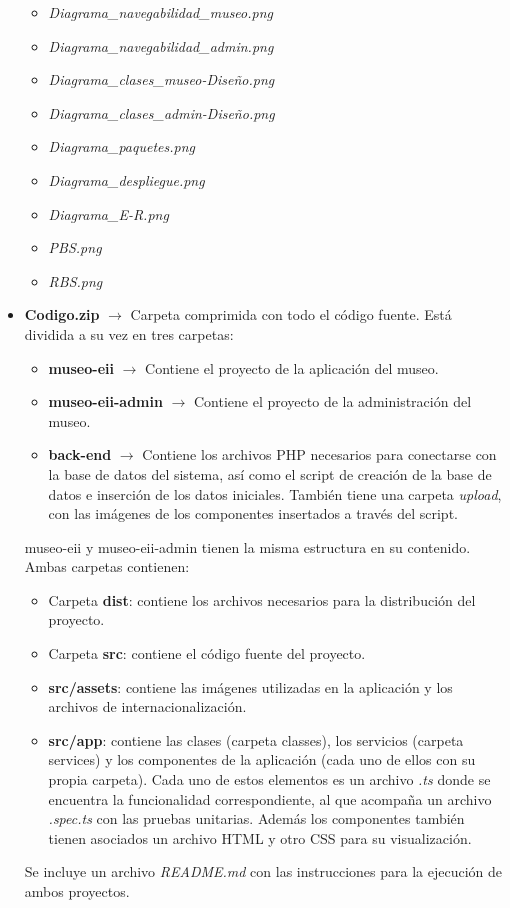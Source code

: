 \begin{itemize}
\begin{itemize}
		\item \textit{Diagrama\_navegabilidad\_museo.png}
		\item \textit{Diagrama\_navegabilidad\_admin.png}
		\item \textit{Diagrama\_clases\_museo-Diseño.png}
		\item \textit{Diagrama\_clases\_admin-Diseño.png}
		\item \textit{Diagrama\_paquetes.png}
		\item \textit{Diagrama\_despliegue.png}
		\item \textit{Diagrama\_E-R.png}
		\item \textit{PBS.png}
		\item \textit{RBS.png}
	\end{itemize}
	\item \textbf{Codigo.zip} \(\rightarrow\) Carpeta comprimida con todo el código fuente. Está dividida a su vez en tres carpetas:
	\begin{itemize}
		\item \textbf{museo-eii} \(\rightarrow\) Contiene el proyecto de la aplicación del museo.
		\item \textbf{museo-eii-admin} \(\rightarrow\) Contiene el proyecto de la administración del museo.
		\item \textbf{back-end} \(\rightarrow\) Contiene los archivos PHP necesarios para conectarse con la base de datos del sistema, así como el script de creación de la base de datos e inserción de los datos iniciales. También tiene una carpeta \textit{upload}, con las imágenes de los componentes insertados a través del script.
	\end{itemize}
	museo-eii y museo-eii-admin tienen la misma estructura en su contenido. Ambas carpetas contienen:
	\begin{itemize}
		\item Carpeta \textbf{dist}: contiene los archivos necesarios para la distribución del proyecto.
		\item Carpeta \textbf{src}: contiene el código fuente del proyecto.
		\item \textbf{src/assets}: contiene las imágenes utilizadas en la aplicación y los archivos de internacionalización.
		\item \textbf{src/app}: contiene las clases (carpeta classes), los servicios (carpeta services) y los componentes de la aplicación (cada uno de ellos con su propia carpeta). Cada uno de estos elementos es un archivo \textit{.ts} donde se encuentra la funcionalidad correspondiente, al que acompaña un archivo \textit{.spec.ts} con las pruebas unitarias. Además los componentes también tienen asociados un archivo HTML y otro CSS para su visualización.
	\end{itemize} 
\par Se incluye un archivo \textit{README.md} con las instrucciones para la ejecución de ambos proyectos.
\end{itemize}